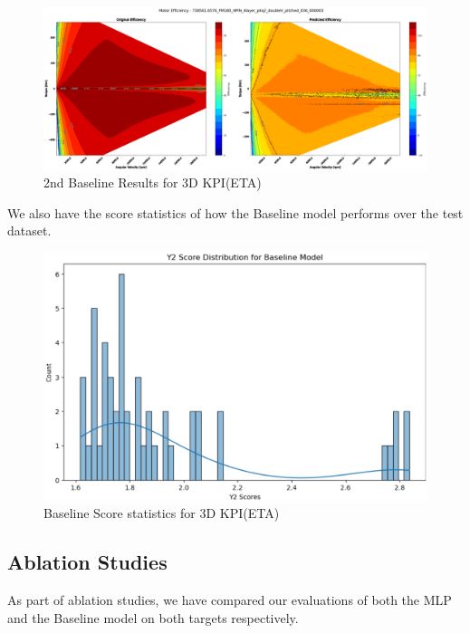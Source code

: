 \documentclass{report} %
\begin{document}
\begin{figure}[H]
    \centering
    \includegraphics[width=1\textwidth]{./ReportImages/KPI3Dprediction4.png} 
    \caption{2nd Baseline Results for 3D KPI(ETA)} 
    \label{fig:2nd MLP Training Results for 3D KPI(ETA)}
\end{figure}

We also have the score statistics of how the Baseline model performs over the test dataset.\\

\begin{figure}[H]
    \centering
    \includegraphics[width=1\textwidth]{./ReportImages/score_baseline_y2.png} 
    \caption{Baseline Score statistics for 3D KPI(ETA)} 
    \label{fig:Baseline Score statistics for 3D KPI(ETA)}
\end{figure}


\subsection*{Ablation Studies}

As part of ablation studies, we have compared our evaluations of both the \ac{MLP} and the Baseline model on both targets respectively.
\end{document}
